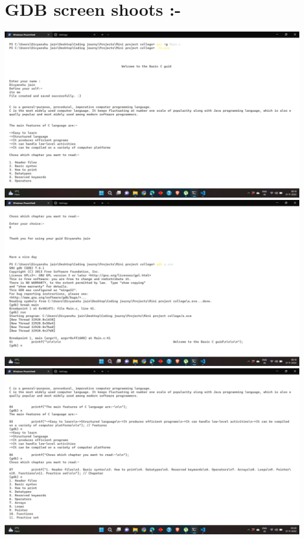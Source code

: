\documentclass{article}
\begin{document}
\section{GDB screen shoots :-}
\includegraphics[width=\linewidth]{pic1.png}\\
\includegraphics[width=\linewidth]{pic2.png}\\
\includegraphics[width=\linewidth]{pic3.png}\\
\end{document}

